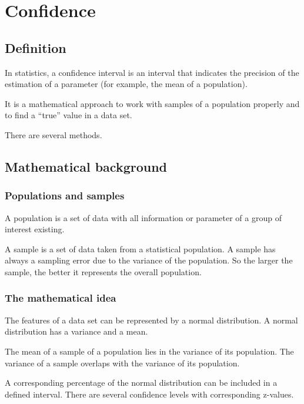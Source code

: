 \documentclass[a4paper,13pt,twoside]{book}
\begin{document}
\chapter{Confidence}



\section{Definition}

In statistics, a confidence interval is an interval that indicates the precision of the estimation of a parameter (for example, the mean of a population). 

It is a mathematical approach to work with samples of a population properly and to find a “true” value in a data set.

There are several methods.



\section{Mathematical background}

\subsection{Populations and samples}

A population is a set of data with all information or parameter of a group of interest existing.

A sample is a set of data taken from a statistical population. A sample has always a sampling error due to the variance of the population. So the larger the sample, the better it represents the overall population.



\subsection{The mathematical idea}

The features of a data set can be represented by a normal distribution. A normal distribution has a variance and a mean. 

The mean of a sample of a population lies in the variance of its population. The variance of a sample overlaps with the variance of its population.

A corresponding percentage of the normal distribution can be included in a defined interval. There are several confidence levels with corresponding z-values.
\end{document}
